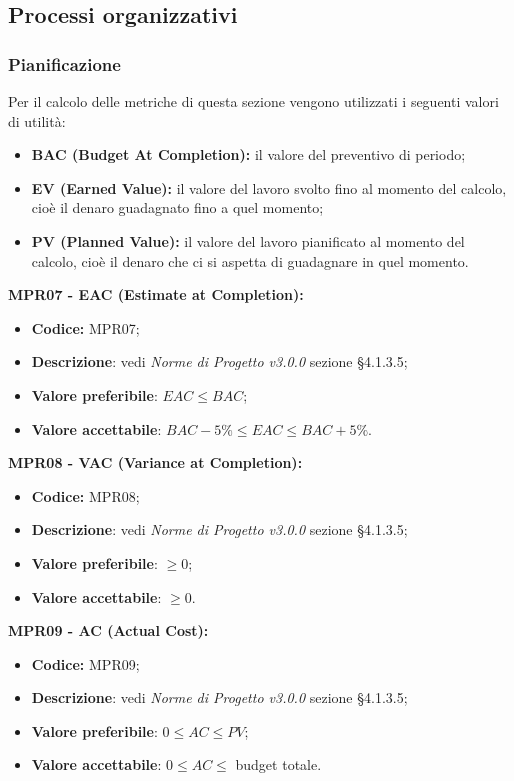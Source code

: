 \subsection{Processi organizzativi}
\subsubsection{Pianificazione}
Per il calcolo delle metriche di questa sezione vengono utilizzati i seguenti valori di utilità:
\begin{itemize}
    \item \textbf{BAC (Budget At Completion):} il valore del preventivo di periodo;
    \item \textbf{EV (Earned Value):}  il valore del lavoro svolto fino al momento del calcolo, cioè il denaro guadagnato fino a quel momento;
    \item \textbf{PV (Planned Value):} il valore del lavoro pianificato al momento del calcolo, cioè il denaro che ci si aspetta di guadagnare in quel momento.
\end{itemize}
\textbf{MPR07 - EAC (Estimate at Completion):}
\begin{itemize}
    \item \textbf{Codice:} MPR07;
    \item \textbf{Descrizione}: vedi \textit{Norme di Progetto v3.0.0} sezione \S 4.1.3.5;
    \item \textbf{Valore preferibile}: $EAC \leq BAC$;
    \item \textbf{Valore accettabile}: $BAC -5\% \leq EAC \leq BAC +5\%.$
\end{itemize}
\textbf{MPR08 - VAC (Variance at Completion):}
\begin{itemize}
    \item \textbf{Codice:} MPR08;
    \item \textbf{Descrizione}: vedi \textit{Norme di Progetto v3.0.0} sezione \S 4.1.3.5;
    \item \textbf{Valore preferibile}: $\geq 0$;
    \item \textbf{Valore accettabile}: $\geq 0$.
\end{itemize}
\textbf{MPR09 - AC (Actual Cost):}
\begin{itemize}
    \item \textbf{Codice:} MPR09;
    \item \textbf{Descrizione}: vedi \textit{Norme di Progetto v3.0.0} sezione \S4.1.3.5;
    \item \textbf{Valore preferibile}: $0 \leq AC \leq PV$;
    \item \textbf{Valore accettabile}: $0 \leq AC \leq$ budget totale.
\end{itemize}
